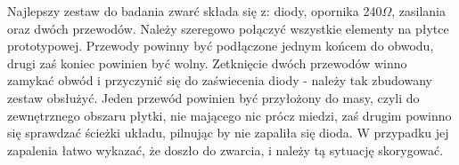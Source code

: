 Najlepszy zestaw do badania zwarć składa się z: diody, opornika 240$\Omega$, zasilania oraz dwóch przewodów. Należy szeregowo połączyć wszystkie elementy na płytce prototypowej. Przewody powinny być podłączone jednym końcem do obwodu, drugi zaś koniec powinien być wolny. Zetknięcie dwóch przewodów winno zamykać obwód i przyczynić się do zaświecenia diody - należy tak zbudowany zestaw obsłużyć. Jeden przewód powinien być przyłożony do masy, czyli do zewnętrznego obszaru płytki, nie mającego nic prócz miedzi, zaś drugim powinno się sprawdzać ścieżki układu, pilnując by nie zapaliła się dioda. W przypadku jej zapalenia łatwo wykazać, że doszło do zwarcia, i należy tą sytuację skorygować.
